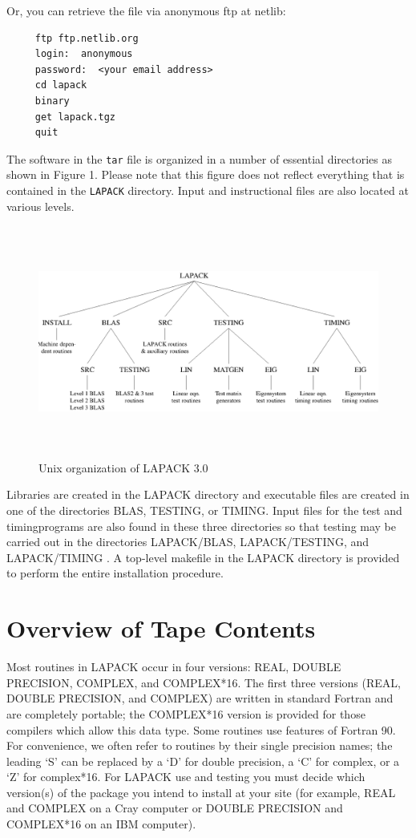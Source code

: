 \documentclass[11pt]{report}
\begin{document}
Or, you can retrieve the file via anonymous ftp at netlib:

\begin{verbatim}
     ftp ftp.netlib.org
     login:  anonymous
     password:  <your email address>
     cd lapack
     binary
     get lapack.tgz
     quit
\end{verbatim}

The software in the \texttt{tar} file
is organized in a number of essential directories as shown
in Figure 1.  Please note that this figure does not reflect everything
that is contained in the \texttt{LAPACK} directory.  Input and instructional
files are also located at various levels.
\begin{figure}
\vspace{11pt}
\centerline{\includegraphics[width=6.5in,height=3in]{org2.ps}}
\caption{Unix organization of LAPACK 3.0}
\vspace{11pt}
\end{figure}
Libraries are created in the LAPACK directory and
executable files are created in one of the directories BLAS, TESTING,
or TIMING\footnotemark[\value{footnote}].  Input files for the test and
timing\footnotemark[\value{footnote}]  programs are also
found in these three directories so that testing may be carried out
in the directories LAPACK/BLAS, LAPACK/TESTING, and LAPACK/TIMING \footnotemark[\value{footnote}].
A top-level makefile in the LAPACK directory is provided to perform the
entire installation procedure.

\section{Overview of Tape Contents}\label{overview}

Most routines in LAPACK occur in four versions: REAL,
DOUBLE PRECISION, COMPLEX, and COMPLEX*16.
The first three versions (REAL, DOUBLE PRECISION, and COMPLEX)
are written in standard Fortran and are completely portable;
the COMPLEX*16 version is provided for
those compilers which allow this data type.
Some routines use features of Fortran 90.
For convenience, we often refer to routines by their single precision
names; the leading `S' can be replaced by a `D' for double precision,
a `C' for complex, or a `Z' for complex*16.
For LAPACK use and testing you must decide which version(s)
of the package you intend to install at your site (for example,
REAL and COMPLEX on a Cray computer or DOUBLE PRECISION and
COMPLEX*16 on an IBM computer).
\end{document}
